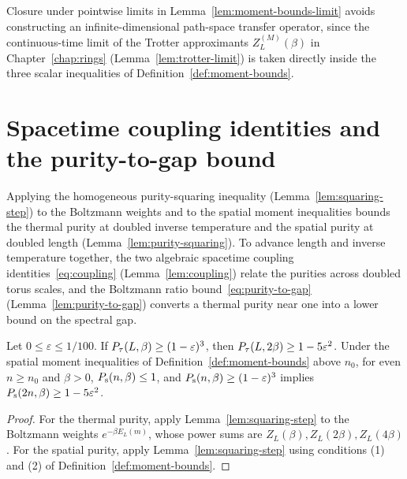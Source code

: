 \begin{remark}
  Closure under pointwise limits in Lemma~\ref{lem:moment-bounds-limit} avoids constructing an
  infinite-dimensional path-space transfer operator, since the continuous-time limit of the Trotter
  approximants \(Z_L^{(M)}(\beta)\) in Chapter~\ref{chap:rings} (Lemma~\ref{lem:trotter-limit}) is
  taken directly inside the three scalar inequalities of Definition~\ref{def:moment-bounds}.
\end{remark}

\section{Spacetime coupling identities and the purity-to-gap bound}

Applying the homogeneous purity-squaring inequality (Lemma~\ref{lem:squaring-step}) to the
Boltzmann weights and to the spatial moment inequalities bounds the thermal purity at doubled
inverse temperature and the spatial purity at doubled length (Lemma~\ref{lem:purity-squaring}). To
advance length and inverse temperature together, the two algebraic spacetime coupling
identities~\eqref{eq:coupling} (Lemma~\ref{lem:coupling}) relate the purities across doubled torus
scales, and the Boltzmann ratio bound~\eqref{eq:purity-to-gap} (Lemma~\ref{lem:purity-to-gap})
converts a thermal purity near one into a lower bound on the spectral gap.

\begin{lemma}
  \label{lem:purity-squaring}
  \leanok
  Let \(0 \le \varepsilon \le 1/100\). If \(P_{\tau}(L, \beta) \ge (1-\varepsilon)^3\), then
  \(P_{\tau}(L, 2\beta) \ge 1 - 5 \varepsilon^2\). Under the spatial moment inequalities of
  Definition~\ref{def:moment-bounds} above \(n_0\), for even \(n \ge n_0\) and \(\beta > 0\),
  \(P_{\mathrm{s}}(n, \beta) \le 1\), and \(P_{\mathrm{s}}(n, \beta) \ge (1-\varepsilon)^3\) implies
  \(P_{\mathrm{s}}(2n, \beta) \ge 1 - 5\varepsilon^2\).
\end{lemma}
\begin{proof}
  \leanok
  For the thermal purity, apply Lemma~\ref{lem:squaring-step} to the Boltzmann weights
  \(e^{-\beta E_L(m)}\), whose power sums are \(Z_L(\beta), Z_L(2\beta), Z_L(4\beta)\). For the
  spatial purity, apply Lemma~\ref{lem:squaring-step} using conditions (1) and (2) of
  Definition~\ref{def:moment-bounds}.
\end{proof}

